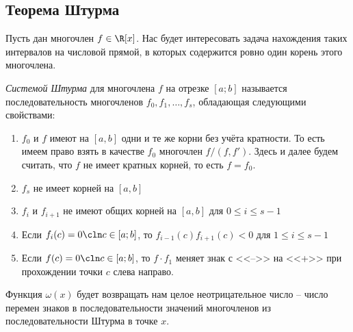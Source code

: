 \subsection{Теорема Штурма}

Пусть дан многочлен $f\in\R[x]$. Нас будет интересовать задача нахождения таких интервалов на числовой прямой, в которых содержится ровно один корень этого многочлена.

\begin{df}
  \emph{Системой Штурма} для многочлена $f$ на отрезке $[a;b]$ называется последовательность многочленов $f_0, f_1,\dots, f_s$, обладающая следующими свойствами:
  \begin{enumerate}
    \item $f_0$ и $f$ имеют на $[a,b]$ одни и те же корни без учёта кратности. То есть имеем право взять в качестве $f_0$ многочлен $f/(f,f')$. Здесь и далее будем считать, что $f$ не имеет кратных корней, то есть $f=f_0$.
    \item $f_s$ не имеет корней на $[a,b]$
    \item $f_i$ и $f_{i+1}$ не имеют общих корней на $[a,b]$ для $0\le i\le s-1$
    \item Если $f_i(c)=0\cln c\in[a;b]$, то $f_{i-1}(c)f_{i+1}(c)<0$ для $1\le i\le s-1$
    \item Если $f(c)=0\cln c\in[a;b]$, то $f\cdot f_1$ меняет знак с <<-->> на <<+>> при прохождении точки $c$ слева направо.
  \end{enumerate}
\end{df}

Функция $\omega(x)$ будет возвращать нам целое неотрицательное число -- число перемен знаков в последовательности значений многочленов из последовательности Штурма в точке $x$.

